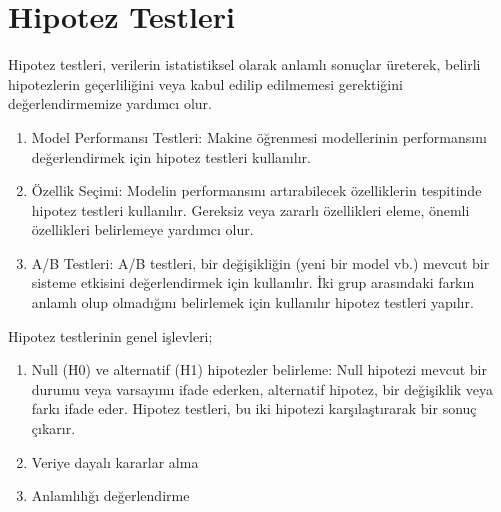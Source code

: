 \section{Hipotez Testleri}
Hipotez testleri, verilerin istatistiksel olarak anlamlı sonuçlar üreterek, belirli hipotezlerin geçerliliğini veya kabul edilip edilmemesi gerektiğini değerlendirmemize yardımcı olur.

\begin{enumerate}
    \item Model Performansı Testleri: Makine öğrenmesi modellerinin performansını değerlendirmek için hipotez testleri kullanılır.
    \item Özellik Seçimi: Modelin performansını artırabilecek özelliklerin tespitinde hipotez testleri kullanılır. Gereksiz veya zararlı özellikleri eleme, önemli özellikleri belirlemeye yardımcı olur.
    \item A/B Testleri: A/B testleri, bir değişikliğin (yeni bir model vb.) mevcut bir sisteme etkisini değerlendirmek için kullanılır. İki grup arasındaki farkın anlamlı olup olmadığını belirlemek için kullanılır hipotez testleri yapılır.
\end{enumerate}
Hipotez testlerinin genel işlevleri;
\begin{enumerate}
    \item Null (H0) ve alternatif (H1) hipotezler belirleme: Null hipotezi mevcut bir durumu veya varsayımı ifade ederken, alternatif hipotez, bir değişiklik veya farkı ifade eder. Hipotez testleri, bu iki hipotezi karşılaştırarak bir sonuç çıkarır.
    \item Veriye dayalı kararlar alma
    \item Anlamlılığı değerlendirme
\end{enumerate}

